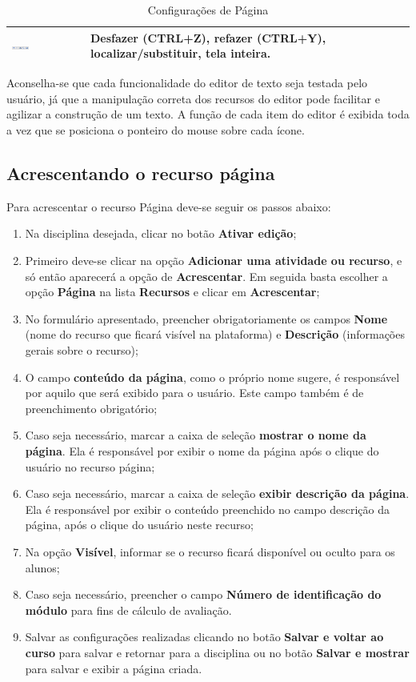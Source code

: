 \begin{table}[htbp]
\begin{flushleft}
\begin{tabular}{p{8cm}|p{6cm}}
\includegraphics[width=0.25\textwidth]{imagem/cap4/fig11.jpg} & Desfazer (CTRL+Z), refazer (CTRL+Y), localizar/substituir, tela inteira.\\\hline
\end{tabular}
\caption{Configurações de Página}
  \label{table:cap4_table1}
\end{flushleft}
\end{table}%

Aconselha-se que cada funcionalidade do editor de texto seja testada pelo usuário, já que a manipulação correta dos recursos do editor pode facilitar e agilizar a construção de um texto. A função de cada item do editor é exibida toda a vez que se posiciona o ponteiro do mouse sobre cada ícone.

\subsection{Acrescentando o recurso página}

Para acrescentar o recurso Página deve-se seguir os passos abaixo:
\begin{enumerate}
\item Na disciplina desejada, clicar no botão \textbf{ Ativar edição};
\item Primeiro deve-se clicar na opção \textbf{Adicionar uma atividade ou recurso}, e só então aparecerá a opção de \textbf{Acrescentar}. Em seguida basta escolher a opção \textbf{Página} na lista \textbf{Recursos} e clicar em \textbf{Acrescentar};
\item No formulário apresentado, preencher obrigatoriamente os campos \textbf{Nome} (nome do recurso que ficará visível na plataforma) e \textbf{Descrição} (informações gerais sobre o recurso);
\item O campo \textbf{conteúdo da página}, como o próprio nome sugere, é responsável por aquilo que será exibido para o usuário. Este campo também é de preenchimento obrigatório;
\item Caso seja necessário, marcar a caixa de seleção \textbf{mostrar o nome da página}. Ela é responsável por exibir o nome da página após o clique do usuário no recurso página;
\item Caso seja necessário, marcar a caixa de seleção \textbf{exibir descrição da página}. Ela é responsável por exibir o conteúdo preenchido no campo descrição da página, após o clique do usuário neste recurso;
\item Na opção \textbf{Visível}, informar se o recurso ficará disponível ou oculto para os alunos;
\item Caso seja necessário, preencher o campo \textbf{Número de identificação do módulo} para fins de cálculo de avaliação.
\item Salvar as configurações realizadas clicando no botão  \textbf{Salvar e voltar ao curso} para salvar e retornar para a disciplina ou no botão \textbf{Salvar e mostrar } para salvar e exibir a página criada.
\end{enumerate}

